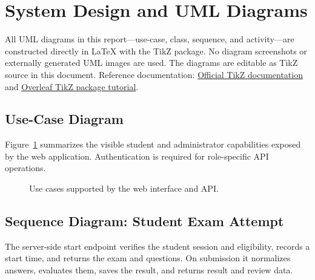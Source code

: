 \documentclass[12pt,a4paper,oneside]{book}
\newcommand{\umlactor}[3]{\begin{scope}[shift={(#1,#2)},purple!65!black,thick]
  \draw (0,0.6) circle (0.2);
  \draw (0,0.4)--(0,-0.1) (-0.3,0.25)--(0.3,0.25) (0,-0.1)--(-0.25,-0.55) (0,-0.1)--(0.25,-0.55);
  \node[font=\small,below,text=black] at (0,-0.55) {#3};
\end{scope}}
\begin{document}
\section{System Design and UML Diagrams}
All UML diagrams in this report---use-case, class, sequence, and activity---are constructed directly in LaTeX with the TikZ package. No diagram screenshots or externally generated UML images are used. The diagrams are editable as TikZ source in this document. Reference documentation: \href{https://tikz.dev/}{Official TikZ documentation} and \href{https://www.overleaf.com/learn/latex/TikZ_package}{Overleaf TikZ package tutorial}.

\subsection{Use-Case Diagram}
Figure~\ref{fig:usecase} summarizes the visible student and administrator capabilities exposed by the web application. Authentication is required for role-specific API operations.

\begin{figure}[H]
\centering
{} 
\caption{Use cases supported by the web interface and API.}
\label{fig:usecase}
\end{figure}

\subsection{Sequence Diagram: Student Exam Attempt}
The server-side start endpoint verifies the student session and eligibility, records a start time, and returns the exam and questions. On submission it normalizes answers, evaluates them, saves the result, and returns result and review data.
\end{document}
